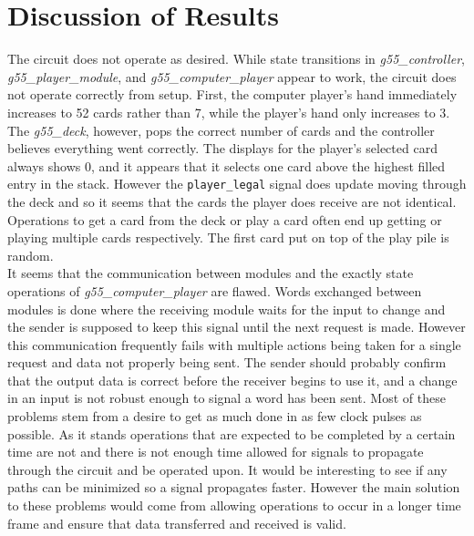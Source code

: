 \documentclass[12pt]{article}
\begin{document}
\section{Discussion of Results}
The circuit does not operate as desired. While state transitions in \textit{g55\_controller}, \textit{g55\_player\_module}, and \textit{g55\_computer\_player} appear to work, the circuit does not operate correctly from setup. First, the computer player's hand immediately increases to 52 cards rather than 7, while the player's hand only increases to 3. The \textit{g55\_deck}, however, pops the correct number of cards and the controller believes everything went correctly. The displays for the player's selected card always shows 0, and it appears that it selects one card above the highest filled entry in the stack. However the \texttt{player\_legal} signal does update moving through the deck and so it seems that the cards the player does receive are not identical. Operations to get a card from the deck or play a card often end up getting or playing multiple cards respectively. The first card put on top of the play pile is random. \\

It seems that the communication between modules and the exactly state operations of \textit{g55\_computer\_player} are flawed. Words exchanged between modules is done where the receiving module waits for the input to change and the sender is supposed to keep this signal until the next request is made. However this communication frequently fails with multiple actions being taken for a single request and data not properly being sent. The sender should probably confirm that the output data is correct before the receiver begins to use it, and a change in an input is not robust enough to signal a word has been sent. Most of these problems stem from a desire to get as much done in as few clock pulses as possible. As it stands operations that are expected to be completed by a certain time are not and there is not enough time allowed for signals to propagate through the circuit and be operated upon. It would be interesting to see if any paths can be minimized so a signal propagates faster. However the main solution to these problems would come from allowing operations to occur in a longer time frame and ensure that data transferred and received is valid.
\end{document}
